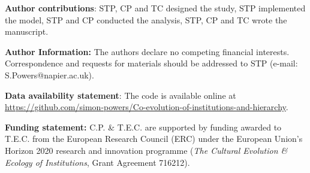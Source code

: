 \documentclass{rstb}
\begin{document}
\textbf{Author contributions}: STP, CP and TC designed the study, STP implemented the model, STP and CP conducted the analysis, STP, CP and TC wrote the manuscript.

\textbf{Author Information:} The authors declare no competing financial interests. Correspondence and requests for materials should be addressed to STP (e-mail: S.Powers@napier.ac.uk).

\textbf{Data availability statement}: The code is available online at\\ \url{https://github.com/simon-powers/Co-evolution-of-institutions-and-hierarchy}.

\textbf{Funding statement:} C.P. \& T.E.C. are supported by funding awarded to T.E.C. from the European Research Council (ERC) under the European Union’s Horizon 2020 research and innovation programme (\textit{The Cultural Evolution \& Ecology of Institutions}, Grant Agreement 716212).
\end{document}
